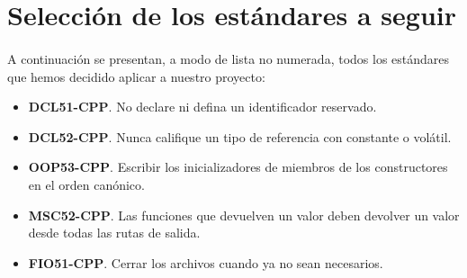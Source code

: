\section{Selección de los estándares a seguir}

\paragraph{}A continuación se presentan, a modo de lista no numerada, todos los estándares que hemos decidido aplicar a nuestro proyecto:

\begin{itemize}
	\item \textbf{DCL51-CPP}. No declare ni defina un identificador reservado.
	\item \textbf{DCL52-CPP}. Nunca califique un tipo de referencia con constante o volátil.
	\item \textbf{OOP53-CPP}. Escribir los inicializadores de miembros de los constructores en el orden canónico.
	\item \textbf{MSC52-CPP}. Las funciones que devuelven un valor deben devolver un valor desde todas las rutas de salida.
	\item \textbf{FIO51-CPP}. Cerrar los archivos cuando ya no sean necesarios.
\end{itemize}

\newpage